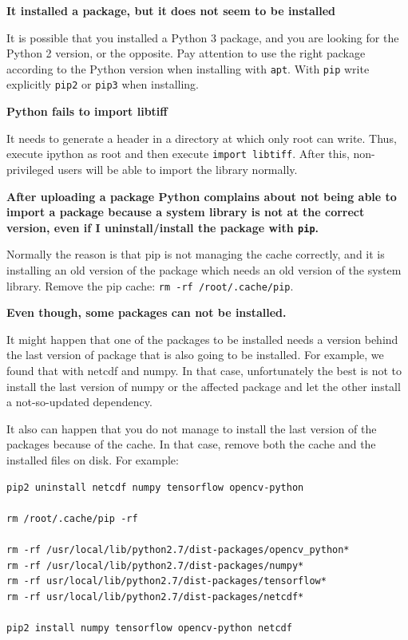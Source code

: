 \documentclass[a4paper,12pt]{article}
\begin{document}
\textbf{It installed a package, but it does not seem to be installed}

It is possible that you installed a Python 3 package, and you are looking for the Python 2 version, or the opposite. Pay attention to use the right package according to the Python version when installing with {\tt apt}. With {\tt pip} write explicitly {\tt pip2} or {\tt pip3} when installing.
\vspace{0.5cm}


\textbf{Python fails to import libtiff}

It needs to generate a header in a directory at which only root can write. Thus, execute ipython as root and then execute {\tt import libtiff}. After this, non-privileged users will be able to import the library normally.
\vspace{0.5cm}

\textbf{After uploading a package Python complains about not being able to import a package because a system library is not at the correct version, even if I uninstall/install the package with {\tt pip}.}

Normally the reason is that pip is not managing the cache correctly, and it is installing an old version of the package which needs an old version of the system library. Remove the pip cache: {\tt rm -rf /root/.cache/pip}.
\vspace{0.5cm}

\textbf{Even though, some packages can not be installed.}

It might happen that one of the packages to be installed needs a version behind the last version of package that is also going to be installed. For example, we found that with netcdf and numpy. In that case, unfortunately the best is not to install the last version of numpy or the affected package and let the other install a not-so-updated dependency.

It also can happen that you do not manage to install the last version of the packages because of the cache. In that case, remove both the cache and the installed files on disk. For example:

\begin{verbatim}
pip2 uninstall netcdf numpy tensorflow opencv-python

rm /root/.cache/pip -rf

rm -rf /usr/local/lib/python2.7/dist-packages/opencv_python*
rm -rf /usr/local/lib/python2.7/dist-packages/numpy*
rm -rf usr/local/lib/python2.7/dist-packages/tensorflow*
rm -rf usr/local/lib/python2.7/dist-packages/netcdf*

pip2 install numpy tensorflow opencv-python netcdf
\end{verbatim}
\vspace{0.5cm}
\end{document}
